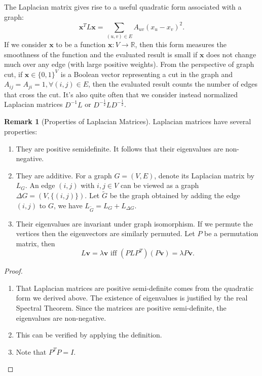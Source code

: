 \documentclass[a4paper]{article}
\theoremstyle{definition}
\newtheorem{remark}{Remark}[section]
\begin{document}
The Laplacian matrix gives rise to a useful quadratic form associated with a graph:
\begin{equation}
    \textbf{x}^{T}L\textbf{x} = \sum_{(u, v)\in E}A_{uv}(x_u-x_v)^2.
\end{equation}
If we consider $\textbf{x}$ to be a function $\textbf{x}:V\rightarrow\mathbb{R}$, then this form measures the smoothness of the function and the evaluated result is small if $\textbf{x}$ does not change much over any edge (with large positive weights). From the perspective of graph cut, if $\textbf{x}\in\{0, 1\}^{V}$ is a Boolean vector representing a cut in the graph and $A_{ij}=A_{ji}=1, \forall (i, j)\in E$, then the evaluated result counts the number of edges that cross the cut. It's also quite often that we consider instead normalized Laplacian matrices $D^{-1}L$ or $D^{-\frac{1}{2}}LD^{-\frac{1}{2}}$.

\begin{remark}[Properties of Laplacian Matrices]
Laplacian matrices have several properties:
\begin{enumerate}
    \item They are positive semidefinite. It follows that their eigenvalues are non-negative.
    \item They are additive. For a graph $G=(V, E)$, denote its Laplacian matrix by $L_G$. An edge $(i, j)$ with $i, j\in V$ can be viewed as a graph $\Delta G=(V, \{(i, j)\})$. Let $\tilde{G}$ be the graph obtained by adding the edge $(i, j)$ to $G$, we have $L_{\tilde{G}}=L_G+L_{\Delta G}$.
    \item Their eigenvalues are invariant under graph isomorphism. If we permute the vertices then the eigenvectors are similarly permuted. Let $P$ be a permutation matrix, then
    \begin{equation}
        L\textbf{v} = \lambda \textbf{v} \text{ iff } (PLP^{T})(P\textbf{v}) = \lambda P\textbf{v}.
    \end{equation}
\end{enumerate}
\end{remark}

\begin{proof}
\hfill
\begin{enumerate}
    \item That Laplacian matrices are positive semi-definite comes from the quadratic form we derived above. The existence of eigenvalues is justified by the real Spectral Theorem. Since the matrices are positive semi-definite, the eigenvalues are non-negative. 
    \item This can be verified by applying the definition.
    \item Note that $P^{T}P=I$.
\end{enumerate}
\end{proof}
\end{document}
